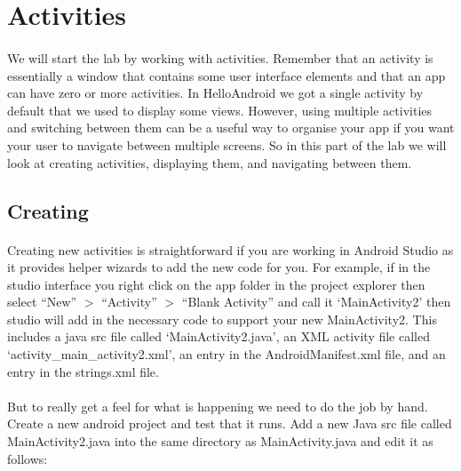 \documentclass[12pt, a4paper, twoside]{book}
\begin{document}
\section{Activities}
\paragraph{} We will start the lab by working with activities. Remember that an activity is essentially a window that contains some user interface elements and that an app can have zero or more activities. In HelloAndroid we got a single activity by default that we used to display some views. However, using multiple activities and switching between them can be a useful way to organise your app if you want your user to navigate between multiple screens. So in this part of the lab we will look at creating activities, displaying them, and navigating between them.


\subsection{Creating}
\paragraph{} Creating new activities is straightforward if you are working in Android Studio as it provides helper wizards to add the new code for you. For example, if in the studio interface you right click on the app folder in the project explorer then select ``New'' $>$ ``Activity'' $>$ ``Blank Activity'' and call it `MainActivity2' then studio will add in the necessary code to support your new MainActivity2. This includes a java src file called `MainActivity2.java', an XML activity file called `activity\_main\_activity2.xml', an entry in the AndroidManifest.xml file, and an entry in the strings.xml file.

\paragraph{} But to really get a feel for what is happening we need to do the job by hand. Create a new android project and test that it runs. Add a new Java src file called MainActivity2.java into the same directory as MainActivity.java and edit it as follows:
\end{document}
